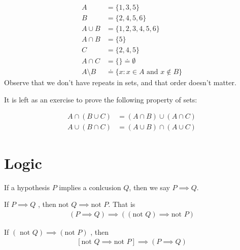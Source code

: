 \begin{example}
\begin{equation*}
\begin{split}
	A & = \{1,3,5\} \\
	B & = \{2,4,5,6\} \\
	A \cup B &= \{1,2,3,4,5,6\} \\
	A \cap B & = \{5\} \\
	C & = \{2,4,5\} \\
	A \cap C & = \{\} \doteq \emptyset \\
	A \setminus B & \doteq \{ x: x \in A \text{ and } x \not \in B\}
\end{split}
\end{equation*}
Observe that we don't have repeats in sets, and that order doesn't matter.

It is left as an exercise to prove the following property of sets:
\begin{lemma}
\begin{equation*}
\begin{split}
	A \cap (B \cup C) &= (A \cap B)  \cup (A \cap C) \\
	A \cup (B \cap C) &= (A \cup B)  \cap (A \cup C) 
\end{split}
\end{equation*}
\end{lemma}

\end{example}
\section{Logic} 
\begin{notation}
	If a hypothesis $P$ implies a conlcusion $Q$, then we say $P \implies Q$.
\end{notation}
\begin{lemma}[Contrapositive]\label{lem:contrapositive}
	If $P \implies Q $ , then $ \text{not } Q \implies \text{not } P$. That is
	\begin{equation*}
	\begin{split}
		( P \implies Q )  \implies \left( (\text{not } Q)  \implies \text{not }
		P\right) 
	\end{split}
	\end{equation*}
\end{lemma}
\begin{corollary}
	If $ (\text{ not } Q)  \implies (\text{not }  P ) $ , then
	\begin{equation*}
	\begin{split}
		\left[  \text{not } Q   \implies \text{not }  P\right] \implies (P
		\implies Q) 
	\end{split}
	\end{equation*}
\end{corollary}

